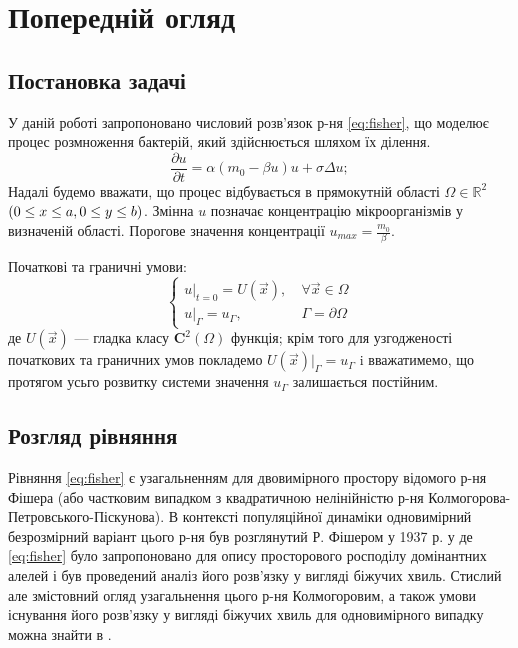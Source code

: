 \section{Попередній огляд}
\subsection{Постановка задачі}

У даній роботі запропоновано числовий розв’язок р-ня \eqref{eq:fisher}, що моделює процес розмноження бактерій, який
здійснюється шляхом їх ділення.
\begin{equation}
\frac{\partial u}{\partial t} = \alpha (m_{0} -\beta u)u + \sigma\Delta u; \label{eq:fisher}
\end{equation}
Надалі будемо вважати, що процес відбувається в прямокутній  області $\Omega \in \mathbb{R}^{2} $  $(0 \le x \le a, \\
0 \le y \le b)$. Змінна $u$ позначає концентрацію мікроорганізмів у визначеній області.
Порогове значення концентрації $u_{max}=\frac{m_{0}}{\beta}$.

Початкові та граничні умови:
\begin{equation}
	\begin{cases} u\rvert_{t=0} = U(\vec{x}),\ &\forall \vec {x} \in \Omega \\
	u\rvert_\Gamma = u_{\Gamma},\ &\Gamma = \partial \Omega \end{cases} 
\end{equation}
де $U(\vec{x})$  --- гладка класу $\mathbf{C}^2(\Omega)$ функція; крім того для узгодженості початкових та граничних умов покладемо $U(\vec{x})\rvert_\Gamma = u_\Gamma$ i вважатимемо, що протягом усьго розвитку системи значення $u_\Gamma$ залишається постійним. \\
\subsection{Розгляд рівняння}
Рівняння \eqref{eq:fisher} є узагальненням для двовимірного простору відомого р-ня Фішера (або частковим випадком з квадратичною нелінійністю р-ня Колмогорова-Петровського-Піскунова). В контексті популяційної динаміки одновимірний безрозмірний варіант цього р-ня був розглянутий  Р. Фішером у 1937 р. у \cite{fisher} де \eqref{eq:fisher} було запропоновано для опису просторового росподілу домінантних алелей і був проведений аналіз його розв’язку у вигляді біжучих хвиль. Стислий але змістовний огляд узагальнення цього р-ня Колмогоровим, а також умови існування його розв’язку у вигляді біжучих хвиль для одновимірного випадку можна знайти в \cite{treft}.

